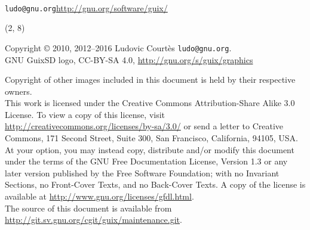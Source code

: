 \documentclass{beamer}
\begin{document}
\begin{frame}[plain]

\vfill{
  \vspace{2.5cm}
  \\[1.0cm]
  \texttt{ludo@gnu.org}\hfill{\alert{\url{http://gnu.org/software/guix/}}}
}

\end{frame}

\begin{frame}{}

  \begin{textblock}{12}(2, 8)
    \tiny{
      Copyright \copyright{} 2010, 2012--2016 Ludovic Courtès \texttt{ludo@gnu.org}.\\[3.0mm]
      GNU GuixSD logo, CC-BY-SA 4.0, \url{http://gnu.org/s/guix/graphics}

      Copyright of other images included in this document is held by
      their respective owners.
      \\[3.0mm]
      This work is licensed under the \alert{Creative Commons
        Attribution-Share Alike 3.0} License.  To view a copy of this
      license, visit
      \url{http://creativecommons.org/licenses/by-sa/3.0/} or send a
      letter to Creative Commons, 171 Second Street, Suite 300, San
      Francisco, California, 94105, USA.
      \\[2.0mm]
      At your option, you may instead copy, distribute and/or modify
      this document under the terms of the \alert{GNU Free Documentation
        License, Version 1.3 or any later version} published by the Free
      Software Foundation; with no Invariant Sections, no Front-Cover
      Texts, and no Back-Cover Texts.  A copy of the license is
      available at \url{http://www.gnu.org/licenses/gfdl.html}.
      \\[2.0mm]
      The source of this document is available from
      \url{http://git.sv.gnu.org/cgit/guix/maintenance.git}.
    }
  \end{textblock}
\end{frame}
\end{document}
